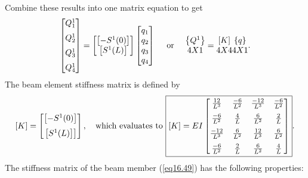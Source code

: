 \documentclass{AeroStructure-ERJohnson}
\begin{document}
Combine these results into one matrix equation to get
\begin{align}\label{eq16.48}
\left[\begin{array}{@{}c@{}}Q_{1}^{1} \\[6pt] Q_{2}^{1} \\[6pt] Q_{3}^{1} \\[6pt] Q_{4}^{1}\end{array}\right]=\left[\begin{array}{@{}c@{}}\left[-S^{1}(0)\right] \\{\left[S^{1}(L)\right]}\end{array}\right]\left[\begin{array}{@{}l@{}}q_{1} \\q_{2} \\q_{3} \\q_{4}\end{array}\right] \quad \text { or } \quad\begin{array}{@{}c@{}}\left\{Q^{1}\right\}\\4X1\end{array}=\begin{array}{@{}c@{}}[K]\\4X4\end{array} \begin{array}{@{}c@{}}\{q\}\\ 4X1\end{array}.
\end{align}
The beam element stiffness matrix is defined by
\begin{align}\label{eq16.49}
[K]=\left[\begin{array}{@{}c@{}}{\left[-S^{1}(0)\right]} \\[6pt]\left.\left[S^{1}(L)\right]\right]\end{array}\right], \quad \text{which evaluates to } \boxed{[K]=E I\left[\begin{array}{@{}cccc@{}}\frac{12}{L^{3}} & \frac{-6}{L^{2}} & \frac{-12}{L^{3}} & \frac{-6}{L^{2}} \\[6pt]\frac{-6}{L^{2}} & \frac{4}{L} & \frac{6}{L^{2}} & \frac{2}{L} \\[6pt]\frac{-12}{L^{3}} & \frac{6}{L^{2}} & \frac{12}{L^{3}} & \frac{6}{L^{2}} \\[6pt]\frac{-6}{L^{2}} & \frac{2}{L} & \frac{6}{L^{2}} & \frac{4}{L}\end{array}\right]}.
\end{align}
The stiffness matrix of the beam member (\ref{eq16.49}) has the following properties:
\end{document}
